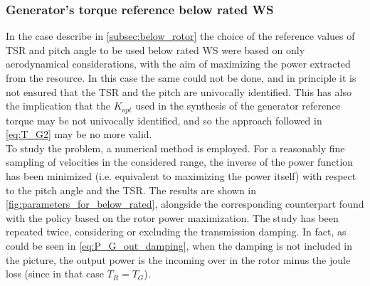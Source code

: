 \subsubsection{Generator's torque reference below rated WS}

In the case describe in \autoref{subsec:below_rotor} the choice of the reference values of TSR and pitch angle to be used below rated WS were based on only aerodynamical considerations, with the aim of maximizing the power extracted from the resource. In this case the same could not be done, and in principle it is not ensured that the TSR and the pitch are univocally identified. This has also the implication that the $K_{opt}$ used in the synthesis of the generator reference torque may be not univocally identified, and so the approach followed in \autoref{eq:T_G2} may be no more valid. \\
To study the problem, a numerical method is employed. For a reasonably fine sampling of velocities in the considered range, the inverse of the power function has been minimized (i.e. equivalent to maximizing the power itself) with respect to the pitch angle and the TSR. The results are shown in \autoref{fig:parameters_for_below_rated}, alongside the corresponding counterpart found with the policy based on the rotor power maximization. The study has been repeated twice, considering or excluding the transmission damping. In fact, as could be seen in \autoref{eq:P_G_out_damping}, when the damping is not included in the picture, the output power is the incoming over in the rotor minus the joule loss (since in that case $T_R=T_G$).
